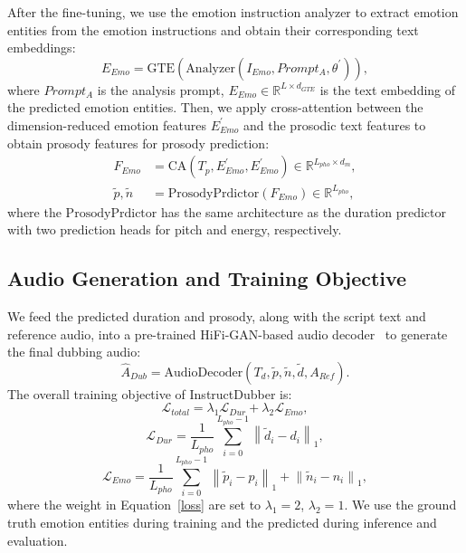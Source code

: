 After the fine-tuning, we use the emotion instruction analyzer to extract emotion entities from the emotion instructions and obtain their corresponding text embeddings:
\begin{equation}
     E_{Emo} = \mathrm{GTE}(\mathrm{Analyzer}(I_{Emo},Prompt_{A}, \theta^{\prime})),
\end{equation}
where $Prompt_{A}$ is the analysis prompt, $E_{Emo}\in\mathbb{R}^{L\times d_{GTE}}$ is the text embedding of the predicted emotion entities.
Then, we apply cross-attention between the dimension-reduced emotion features $E_{Emo}^{\prime}$ and the prosodic text features to obtain prosody features for prosody prediction:
\begin{equation}
\begin{split}
    F_{Emo}&=\mathrm{CA}(T_p, E_{Emo}^{\prime}, E_{Emo}^{\prime})\in\mathbb{R}^{L_{pho}\times d_{m}},
    \\ \tilde{p}, \tilde{n}&= \mathrm{ProsodyPrdictor}(F_{Emo})\in\mathbb{R}^{L_{pho}},
    \end{split}
\end{equation}
where the $\mathrm{ProsodyPrdictor}$ has the same architecture as the duration predictor with two prediction heads for pitch and energy, respectively.



\subsection{Audio Generation and Training Objective}
We feed the predicted duration and prosody, along with the script text and reference audio, into a pre-trained HiFi-GAN-based audio decoder~\cite{hifigan} to generate the final dubbing audio:
\begin{equation}
     \hat{A} _{Dub} = \mathrm{AudioDecoder}(T_{d}, \tilde{p}, \tilde{n}, \tilde{d}, A_{Ref}).
\end{equation}
The overall training objective of InstructDubber is:
\begin{equation}
    \mathcal{L}_{total} = \lambda _1\mathcal{L}_{Dur}+\lambda _2\mathcal{L}_{Emo},
    \label{loss}
\end{equation}
\begin{equation}
    \mathcal{L}_{Dur} = \frac{1}{L_{pho}} \sum_{i=0}^{L_{pho}-1} \left \| \widetilde d_i-d_i \right \|_1,
\end{equation}
\begin{equation}
\mathcal{L}_{Emo} = \frac{1}{L_{pho}} \sum_{i=0}^{L_{pho}-1} \left \| \widetilde p_i-p_i \right \|_1 + \left \| \widetilde n_i-n_i \right \|_1,
\end{equation}
where the weight in Equation~\eqref{loss} are set to $\lambda_1 = 2$, $\lambda_2 = 1$.
We use the ground truth emotion entities during training and the predicted during inference and evaluation.

